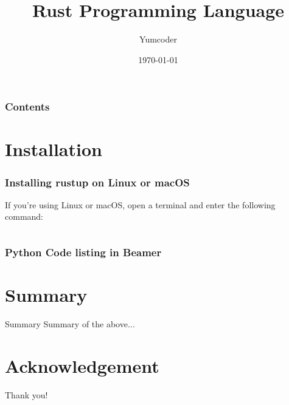 \documentclass{beamer}
\title[Rust-Lang]{Rust Programming Language}
\author[Yumcoder]{Yumcoder}
\institute[UoT]{University of Toronto}
\date[{\today} ]
{\today}
\begin{document}
\frame{\titlepage}
\begin{frame}
\frametitle{Contents}
\tableofcontents
\end{frame}
\section{Installation}
\begin{frame}[fragile]
\frametitle{Installing rustup on Linux or macOS}
If you’re using Linux or macOS, open a terminal and enter the following command:
\scriptsize
\inputminted{shell}{./code/install.shell}
\end{frame}

\begin{frame}[fragile]
\frametitle{Python Code listing in Beamer}
\end{frame}

\section{Summary}

\begin{frame}{Summary}
Summary of the above...
\end{frame}

\section*{Acknowledgement}  
\begin{frame}
\Huge{\centerline{Thank you!}}
\end{frame}
\end{document}
